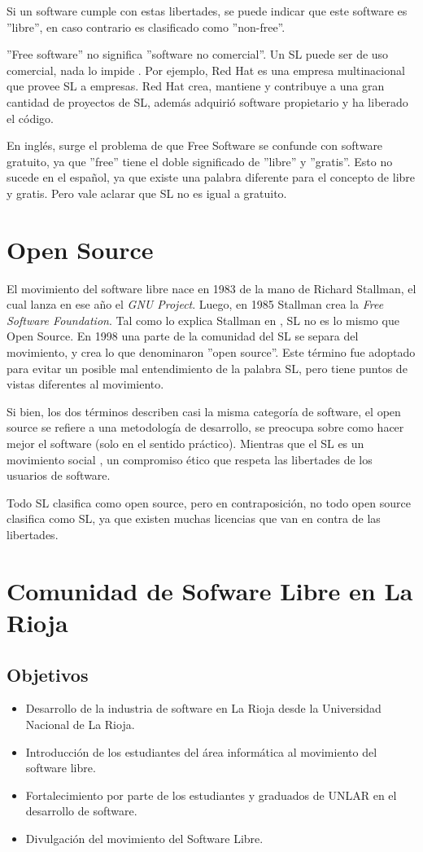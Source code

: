 \documentclass[12pt]{article}
\begin{document}
Si un software cumple con estas libertades, se puede indicar que este software es ''libre'', en caso contrario es clasificado como ''non-free''.

''Free software'' no significa ''software no comercial''. Un SL puede ser de uso comercial, nada lo impide \cite{freesw}. Por ejemplo, Red Hat es una empresa multinacional que provee SL a empresas. Red Hat crea, mantiene y contribuye a una gran cantidad de proyectos de SL, además adquirió software propietario y ha liberado el código. 

En inglés, surge el problema de que Free Software se confunde con software gratuito, ya que ''free'' tiene el doble significado de ''libre'' y ''gratis''. Esto no sucede en el español, ya que existe una palabra diferente para el concepto de libre y gratis. Pero vale aclarar que SL no es igual a gratuito. 


\section{Open Source}
El movimiento del software libre nace en 1983 de la mano de Richard Stallman, el cual lanza en ese año el \textit{GNU Project}. Luego, en 1985 Stallman crea la \textit{Free Software Foundation}. Tal como lo explica Stallman en \cite{richard-open}, SL no es lo mismo que Open Source. En 1998 una parte de la comunidad del SL se separa del movimiento, y crea lo que denominaron ''open source''. Este término fue adoptado para evitar un posible mal entendimiento de la palabra SL, pero tiene puntos de vistas diferentes al movimiento.  

Si bien, los dos términos describen casi la misma categoría de software, el open source se refiere a una metodología de desarrollo, se preocupa sobre como hacer mejor el software (solo en el sentido práctico). Mientras que el SL es un movimiento social \cite{richard-open}, un compromiso ético que respeta las libertades de los usuarios de software. 

Todo SL clasifica como open source, pero en contraposición, no todo open source clasifica como SL, ya que existen muchas licencias que van en contra de las libertades. 

\section{Comunidad de Sofware Libre en La Rioja}

\subsection{Objetivos}
\begin{itemize}
	\item Desarrollo de la industria de software en La Rioja desde la Universidad Nacional de La Rioja.
	\item Introducción de los estudiantes del área informática al movimiento del software libre.
	\item Fortalecimiento por parte de los estudiantes y graduados de UNLAR en el desarrollo de software.
	\item Divulgación del movimiento del Software Libre.
\end{itemize}
\end{document}
